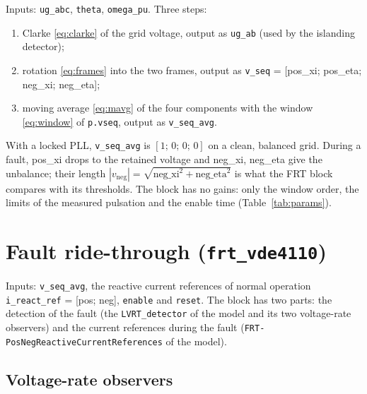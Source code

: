 \documentclass[11pt,a4paper]{scrartcl}
\newcommand{\ped}[1]{_{\mathrm{#1}}}
\newcommand{\code}[1]{\texttt{#1}}
\begin{document}
\begin{onehalfspace}
Inputs: \code{ug\_abc}, \code{theta}, \code{omega\_pu}. Three steps:
\begin{enumerate}[nosep]
	\item Clarke \eqref{eq:clarke} of the grid voltage, output as \code{ug\_ab} (used by the islanding detector);
	\item rotation \eqref{eq:frames} into the two frames, output as \code{v\_seq} = [pos\_xi; pos\_eta; neg\_xi; neg\_eta];
	\item moving average \eqref{eq:mavg} of the four components with the window \eqref{eq:window} of \code{p.vseq}, output as \code{v\_seq\_avg}.
\end{enumerate}
With a locked PLL, \code{v\_seq\_avg} is $[1;\,0;\,0;\,0]$ on a clean, balanced grid. During a fault, pos\_xi drops to the retained voltage and neg\_xi, neg\_eta give the unbalance; their length $|v\ped{neg}| = \sqrt{\text{neg\_xi}^2 + \text{neg\_eta}^2}$ is what the FRT block compares with its thresholds. The block has no gains: only the window order, the limits of the measured pulsation and the enable time (Table~\ref{tab:params}).

\section{Fault ride-through (\code{frt\_vde4110})}
\label{sec:frt}

Inputs: \code{v\_seq\_avg}, the reactive current references of normal operation \code{i\_react\_ref} = [pos; neg], \code{enable} and \code{reset}. The block has two parts: the detection of the fault (the \code{LVRT\_detector} of the model and its two voltage-rate observers) and the current references during the fault (\code{FRT-PosNegReactiveCurrentReferences} of the model).

\subsection{Voltage-rate observers}
\label{sec:frt_obs}


\end{onehalfspace}
\end{document}
